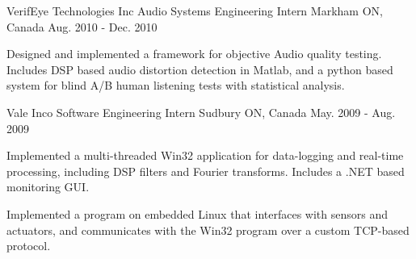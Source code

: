 \begin{cventries}
  \cventry
    {VerifEye Technologies Inc} %
    {Audio Systems Engineering Intern} %
    {Markham ON, Canada} %
    {Aug. 2010 - Dec. 2010} %
    {
      \begin{cvitems} %
        \item {Designed and implemented a framework for objective Audio quality testing. Includes DSP based audio distortion detection in Matlab, and a python based system for blind A/B human listening tests with statistical analysis.}
      \end{cvitems}
    }
	
  \cventry
    {Vale Inco} %
    {Software Engineering Intern} %
    {Sudbury ON, Canada} %
    {May. 2009 - Aug. 2009} %
    {
      \begin{cvitems} %
        \item {Implemented a multi-threaded Win32 application for data-logging and real-time processing, including DSP filters and Fourier transforms. Includes a .NET based monitoring GUI.}
        \item {Implemented a program on embedded Linux that interfaces with sensors and actuators, and communicates with the Win32 program over a custom TCP-based protocol.}
      \end{cvitems}
    }


\vspace{5mm}

\end{cventries}

